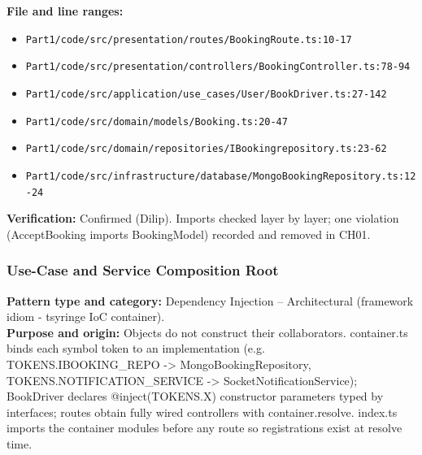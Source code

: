 \documentclass[11pt,a4paper]{article}
\begin{document}
\noindent\textbf{File and line ranges:}\begin{itemize}\setlength\itemsep{0pt}\item \texttt{Part1/\allowbreak{}code/\allowbreak{}src/\allowbreak{}presentation/\allowbreak{}routes/\allowbreak{}BookingRoute.\allowbreak{}ts:10-17}\item \texttt{Part1/\allowbreak{}code/\allowbreak{}src/\allowbreak{}presentation/\allowbreak{}controllers/\allowbreak{}BookingController.\allowbreak{}ts:78-94}\item \texttt{Part1/\allowbreak{}code/\allowbreak{}src/\allowbreak{}application/\allowbreak{}use\_\allowbreak{}cases/\allowbreak{}User/\allowbreak{}BookDriver.\allowbreak{}ts:27-142}\item \texttt{Part1/\allowbreak{}code/\allowbreak{}src/\allowbreak{}domain/\allowbreak{}models/\allowbreak{}Booking.\allowbreak{}ts:20-47}\item \texttt{Part1/\allowbreak{}code/\allowbreak{}src/\allowbreak{}domain/\allowbreak{}repositories/\allowbreak{}IBookingrepository.\allowbreak{}ts:23-62}\item \texttt{Part1/\allowbreak{}code/\allowbreak{}src/\allowbreak{}infrastructure/\allowbreak{}database/\allowbreak{}MongoBookingRepository.\allowbreak{}ts:12-24}\end{itemize}
\noindent\textbf{Verification:} Confirmed (Dilip). Imports checked layer by layer; one violation (AcceptBooking imports BookingModel) recorded and removed in CH01.

\subsubsection*{Use-Case and Service Composition Root}
\textbf{Pattern type and category:} Dependency Injection -- Architectural (framework idiom - tsyringe IoC container).\\
\textbf{Purpose and origin:} Objects do not construct their collaborators. container.ts binds each symbol token to an implementation (e.g. TOKENS.IBOOKING\_REPO -\textgreater{} MongoBookingRepository, TOKENS.NOTIFICATION\_SERVICE -\textgreater{} SocketNotificationService); BookDriver declares @inject(TOKENS.X) constructor parameters typed by interfaces; routes obtain fully wired controllers with container.resolve. index.ts imports the container modules before any route so registrations exist at resolve time.
\end{document}
